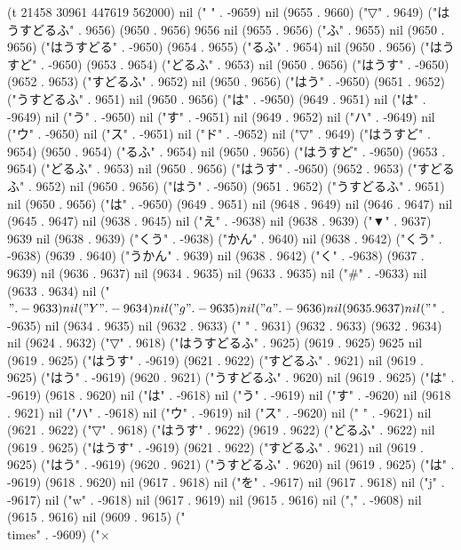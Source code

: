 (t 21458 30961 447619 562000) nil (" " . -9659) nil (9655 . 9660) ("▽" . 9649) ("はうすどるふ" . 9656) (9650 . 9656) 9656 nil (9655 . 9656) ("ふ" . 9655) nil (9650 . 9656) ("はうすどる" . -9650) (9654 . 9655) ("るふ" . 9654) nil (9650 . 9656) ("はうすど" . -9650) (9653 . 9654) ("どるふ" . 9653) nil (9650 . 9656) ("はうす" . -9650) (9652 . 9653) ("すどるふ" . 9652) nil (9650 . 9656) ("はう" . -9650) (9651 . 9652) ("うすどるふ" . 9651) nil (9650 . 9656) ("は" . -9650) (9649 . 9651) nil ("は" . -9649) nil ("う" . -9650) nil ("す" . -9651) nil (9649 . 9652) nil ("ハ" . -9649) nil ("ウ" . -9650) nil ("ス" . -9651) nil ("ド" . -9652) nil ("▽" . 9649) ("はうすど" . 9654) (9650 . 9654) ("るふ" . 9654) nil (9650 . 9656) ("はうすど" . -9650) (9653 . 9654) ("どるふ" . 9653) nil (9650 . 9656) ("はうす" . -9650) (9652 . 9653) ("すどるふ" . 9652) nil (9650 . 9656) ("はう" . -9650) (9651 . 9652) ("うすどるふ" . 9651) nil (9650 . 9656) ("は" . -9650) (9649 . 9651) nil (9648 . 9649) nil (9646 . 9647) nil (9645 . 9647) nil (9638 . 9645) nil ("え" . -9638) nil (9638 . 9639) ("▼" . 9637) 9639 nil (9638 . 9639) ("くう" . -9638) ("かん" . 9640) nil (9638 . 9642) ("くう" . -9638) (9639 . 9640) ("うかん" . 9639) nil (9638 . 9642) ("く" . -9638) (9637 . 9639) nil (9636 . 9637) nil (9634 . 9635) nil (9633 . 9635) nil ("#" . -9633) nil (9633 . 9634) nil ("$" . -9633) nil ("Y" . -9634) nil ("g" . -9635) nil ("a" . -9636) nil (9635 . 9637) nil ("$" . -9635) nil (9634 . 9635) nil (9632 . 9633) (" " . 9631) (9632 . 9633) (9632 . 9634) nil (9624 . 9632) ("▽" . 9618) ("はうすどるふ" . 9625) (9619 . 9625) 9625 nil (9619 . 9625) ("はうす" . -9619) (9621 . 9622) ("すどるふ" . 9621) nil (9619 . 9625) ("はう" . -9619) (9620 . 9621) ("うすどるふ" . 9620) nil (9619 . 9625) ("は" . -9619) (9618 . 9620) nil ("は" . -9618) nil ("う" . -9619) nil ("す" . -9620) nil (9618 . 9621) nil ("ハ" . -9618) nil ("ウ" . -9619) nil ("ス" . -9620) nil (" " . -9621) nil (9621 . 9622) ("▽" . 9618) ("はうす" . 9622) (9619 . 9622) ("どるふ" . 9622) nil (9619 . 9625) ("はうす" . -9619) (9621 . 9622) ("すどるふ" . 9621) nil (9619 . 9625) ("はう" . -9619) (9620 . 9621) ("うすどるふ" . 9620) nil (9619 . 9625) ("は" . -9619) (9618 . 9620) nil (9617 . 9618) nil ("を" . -9617) nil (9617 . 9618) nil ("j" . -9617) nil ("w" . -9618) nil (9617 . 9619) nil (9615 . 9616) nil ("," . -9608) nil (9615 . 9616) nil (9609 . 9615) ("\\times" . -9609) ("×
